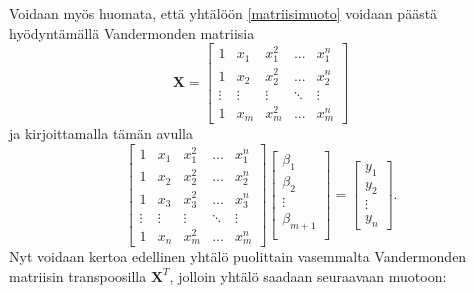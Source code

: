 \documentclass[12pt,a4paper,titlepage]{article}
\newcommand{\matr}[1]{\bm{#1}}
\newcommand{\transpose}[1]{{#1}^T}
\begin{document}
Voidaan myös huomata, että yhtälöön \ref{matriisimuoto} voidaan päästä hyödyntämällä Vandermonden matriisia \cite{vandermonde}
\begin{equation}
	\matr{X} = 
	\begin{bmatrix}
		1 & x_{1} & x_{1}^2 & ...    & x_{1}^n \\
		1 & x_{2} & x_{2}^2 & ...    & x_{2}^n \\
		\vdots    &  \vdots & \vdots  & \ddots & \vdots  \\
		1 & x_{m} & x_{m}^2 &    ... & x_{m}^n
	\end{bmatrix}
\end{equation}
ja kirjoittamalla tämän avulla
\begin{equation} \label{matriiseilla}
	\begin{bmatrix}
			1 & x_{1} & x_{1}^2 & ...    & x_{1}^n \\
			1  & x_{2}& x_{2}^2 & ...    & x_{2}^n \\
			1  & x_{3}& x_{3}^2 & ...    & x_{3}^n \\
			\vdots  & \vdots  & \vdots & \ddots & \vdots  \\
			1  & x_{n}& x_{m}^2 &    ... & x_{m}^n
	\end{bmatrix}
	\begin{bmatrix}
		\beta_1 \\
		\beta_2 \\
		\vdots \\
		\beta_{m+1} \\
	\end{bmatrix}
	=
	\begin{bmatrix}
		y_1 \\
		y_2 \\
		\vdots \\
		y_n
	\end{bmatrix}.
\end{equation}
Nyt voidaan kertoa edellinen yhtälö puolittain vasemmalta Vandermonden matriisin transpoosilla $\transpose{\matr{X}}$, jolloin yhtälö saadaan seuraavaan muotoon:
\end{document}
